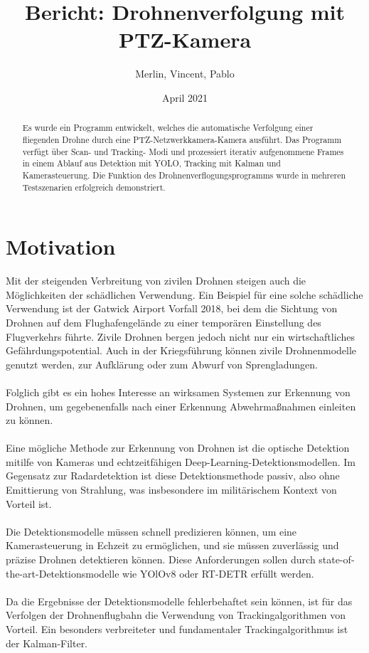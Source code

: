 \documentclass[runningheads]{llncs}
\begin{document}
\title{Bericht: Drohnenverfolgung mit PTZ-Kamera}
\author{Merlin, Vincent, Pablo}

\date{April 2021}



\maketitle

\begin{abstract}
Es wurde ein Programm entwickelt, welches die automatische Verfolgung einer fliegenden Drohne durch eine PTZ-Netzwerkkamera-Kamera ausführt. Das Programm verfügt über Scan- und Tracking- Modi und prozessiert iterativ aufgenommene Frames in einem Ablauf aus Detektion mit YOLO, Tracking mit Kalman und Kamerasteuerung. Die Funktion des Drohnenverflogungsprogramms wurde in mehreren Testszenarien erfolgreich demonstriert.
\end{abstract}


\section{Motivation}
Mit der steigenden Verbreitung von zivilen Drohnen steigen auch die Möglichkeiten der schädlichen Verwendung. Ein Beispiel für eine solche schädliche Verwendung ist der Gatwick Airport Vorfall 2018, bei dem die Sichtung von Drohnen auf dem Flughafengelände zu einer temporären Einstellung des Flugverkehrs führte. Zivile Drohnen bergen jedoch nicht nur ein wirtschaftliches Gefährdungspotential. Auch in der Kriegsführung können zivile Drohnenmodelle genutzt werden, zur Aufklärung oder zum Abwurf von Sprengladungen.\\\\
Folglich gibt es ein hohes Interesse an wirksamen Systemen zur Erkennung von Drohnen, um gegebenenfalls nach einer Erkennung Abwehrmaßnahmen einleiten zu können.\\\\
Eine mögliche Methode zur Erkennung von Drohnen ist die optische Detektion mitilfe von Kameras und echtzeitfähigen Deep-Learning-Detektionsmodellen. Im Gegensatz zur Radardetektion ist diese Detektionsmethode passiv, also ohne Emittierung von Strahlung, was insbesondere im militärischem Kontext von Vorteil ist.\\\\ Die Detektionsmodelle müssen schnell predizieren können, um eine Kamerasteuerung in Echzeit zu ermöglichen, und sie müssen zuverlässig und präzise Drohnen detektieren können. Diese Anforderungen sollen durch state-of-the-art-Detektionsmodelle wie YOlOv8 oder RT-DETR erfüllt werden. \\\\
Da die Ergebnisse der Detektionsmodelle fehlerbehaftet sein können, ist für das Verfolgen der Drohnenflugbahn die Verwendung von Trackingalgorithmen von Vorteil. Ein besonders verbreiteter und fundamentaler Trackingalgorithmus ist der Kalman-Filter.
\end{document}
